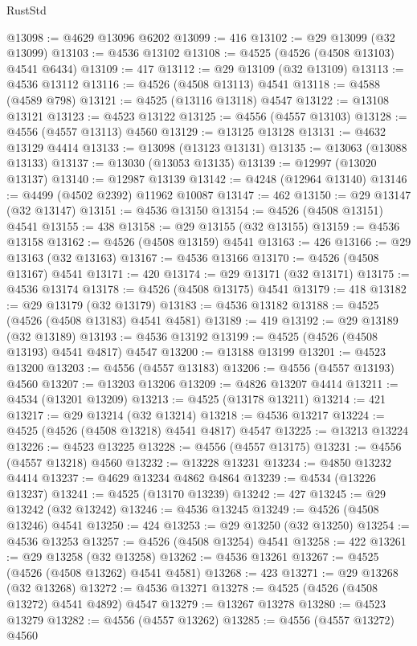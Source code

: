 \begin{lexlean}{RustStd}
\begin{coremodule}
{\begin{coremodule}
{{{{{{{{{{{{{{{{{{{{{{{{{{{{{{{{{{{{{{{{{{{{{{{{{{{{{{{@13098 := @4629 @13096 @6202
@13099 := 416
@13102 := @29 @13099 (@32 @13099)
@13103 := @4536 @13102
@13108 := @4525 (@4526 (@4508 @13103) @4541 @6434)
@13109 := 417
@13112 := @29 @13109 (@32 @13109)
@13113 := @4536 @13112
@13116 := @4526 (@4508 @13113) @4541
@13118 := @4588 (@4589 @798)
@13121 := @4525 (@13116 @13118) @4547
@13122 := @13108 @13121
@13123 := @4523 @13122
@13125 := @4556 (@4557 @13103)
@13128 := @4556 (@4557 @13113) @4560
@13129 := @13125 @13128
@13131 := @4632 @13129 @4414
@13133 := @13098 (@13123 @13131)
@13135 := @13063 (@13088 @13133)
@13137 := @13030 (@13053 @13135)
@13139 := @12997 (@13020 @13137)
@13140 := @12987 @13139
@13142 := @4248 (@12964 @13140)
@13146 := @4499 (@4502 @2392) @11962 @10087
@13147 := 462
@13150 := @29 @13147 (@32 @13147)
@13151 := @4536 @13150
@13154 := @4526 (@4508 @13151) @4541
@13155 := 438
@13158 := @29 @13155 (@32 @13155)
@13159 := @4536 @13158
@13162 := @4526 (@4508 @13159) @4541
@13163 := 426
@13166 := @29 @13163 (@32 @13163)
@13167 := @4536 @13166
@13170 := @4526 (@4508 @13167) @4541
@13171 := 420
@13174 := @29 @13171 (@32 @13171)
@13175 := @4536 @13174
@13178 := @4526 (@4508 @13175) @4541
@13179 := 418
@13182 := @29 @13179 (@32 @13179)
@13183 := @4536 @13182
@13188 := @4525 (@4526 (@4508 @13183) @4541 @4581)
@13189 := 419
@13192 := @29 @13189 (@32 @13189)
@13193 := @4536 @13192
@13199 := @4525 (@4526 (@4508 @13193) @4541 @4817) @4547
@13200 := @13188 @13199
@13201 := @4523 @13200
@13203 := @4556 (@4557 @13183)
@13206 := @4556 (@4557 @13193) @4560
@13207 := @13203 @13206
@13209 := @4826 @13207 @4414
@13211 := @4534 (@13201 @13209)
@13213 := @4525 (@13178 @13211)
@13214 := 421
@13217 := @29 @13214 (@32 @13214)
@13218 := @4536 @13217
@13224 := @4525 (@4526 (@4508 @13218) @4541 @4817) @4547
@13225 := @13213 @13224
@13226 := @4523 @13225
@13228 := @4556 (@4557 @13175)
@13231 := @4556 (@4557 @13218) @4560
@13232 := @13228 @13231
@13234 := @4850 @13232 @4414
@13237 := @4629 @13234 @4862 @4864
@13239 := @4534 (@13226 @13237)
@13241 := @4525 (@13170 @13239)
@13242 := 427
@13245 := @29 @13242 (@32 @13242)
@13246 := @4536 @13245
@13249 := @4526 (@4508 @13246) @4541
@13250 := 424
@13253 := @29 @13250 (@32 @13250)
@13254 := @4536 @13253
@13257 := @4526 (@4508 @13254) @4541
@13258 := 422
@13261 := @29 @13258 (@32 @13258)
@13262 := @4536 @13261
@13267 := @4525 (@4526 (@4508 @13262) @4541 @4581)
@13268 := 423
@13271 := @29 @13268 (@32 @13268)
@13272 := @4536 @13271
@13278 := @4525 (@4526 (@4508 @13272) @4541 @4892) @4547
@13279 := @13267 @13278
@13280 := @4523 @13279
@13282 := @4556 (@4557 @13262)
@13285 := @4556 (@4557 @13272) @4560
}}}}}}}}}}}}}}}}}}}}}}}}}}}}}}}}}}}}}}}}}}}}}}}}}}}}}}}
\end{coremodule}}
\end{coremodule}
\end{lexlean}
